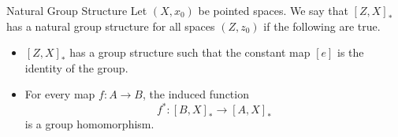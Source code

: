 \documentclass[a4paper]{article}
\begin{document}
\begin{defn}{Natural Group Structure}{} Let $(X,x_0)$ be pointed spaces. We say that $[Z,X]_\ast$ has a natural group structure for all spaces $(Z,z_0)$ if the following are true. 
\begin{itemize}
\item $[Z,X]_\ast$ has a group structure such that the constant map $[e]$ is the identity of the group. 
\item For every map $f:A\to B$, the induced function $$f^\ast:[B,X]_\ast\to[A,X]_\ast$$ is a group homomorphism. 
\end{itemize}
\end{defn}
\end{document}
